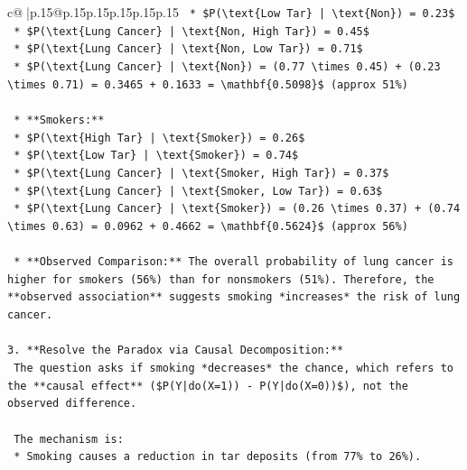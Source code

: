 \documentclass{article}
\begin{document}
{\begin{supertabular}{c@{$\;$}|p{.15\linewidth}@{}p{.15\linewidth}p{.15\linewidth}p{.15\linewidth}p{.15\linewidth}p{.15\linewidth}}
{{{\texttt{        *   \$P(\textbackslash{}text\{Low Tar\} | \textbackslash{}text\{Non\}) = 0.23\$} \\
\texttt{        *   \$P(\textbackslash{}text\{Lung Cancer\} | \textbackslash{}text\{Non, High Tar\}) = 0.45\$} \\
\texttt{        *   \$P(\textbackslash{}text\{Lung Cancer\} | \textbackslash{}text\{Non, Low Tar\}) = 0.71\$} \\
\texttt{        *   \$P(\textbackslash{}text\{Lung Cancer\} | \textbackslash{}text\{Non\}) = (0.77 \textbackslash{}times 0.45) + (0.23 \textbackslash{}times 0.71) = 0.3465 + 0.1633 = \textbackslash{}mathbf\{0.5098\}\$ (approx 51\%)} \\
\\ 
\texttt{    *   **Smokers:**} \\
\texttt{        *   \$P(\textbackslash{}text\{High Tar\} | \textbackslash{}text\{Smoker\}) = 0.26\$} \\
\texttt{        *   \$P(\textbackslash{}text\{Low Tar\} | \textbackslash{}text\{Smoker\}) = 0.74\$} \\
\texttt{        *   \$P(\textbackslash{}text\{Lung Cancer\} | \textbackslash{}text\{Smoker, High Tar\}) = 0.37\$} \\
\texttt{        *   \$P(\textbackslash{}text\{Lung Cancer\} | \textbackslash{}text\{Smoker, Low Tar\}) = 0.63\$} \\
\texttt{        *   \$P(\textbackslash{}text\{Lung Cancer\} | \textbackslash{}text\{Smoker\}) = (0.26 \textbackslash{}times 0.37) + (0.74 \textbackslash{}times 0.63) = 0.0962 + 0.4662 = \textbackslash{}mathbf\{0.5624\}\$ (approx 56\%)} \\
\\ 
\texttt{    *   **Observed Comparison:** The overall probability of lung cancer is higher for smokers (56\%) than for nonsmokers (51\%). Therefore, the **observed association** suggests smoking *increases* the risk of lung cancer.} \\
\\ 
\texttt{3.  **Resolve the Paradox via Causal Decomposition:**} \\
\texttt{    The question asks if smoking *decreases* the chance, which refers to the **causal effect** (\$P(Y|do(X=1)) {-} P(Y|do(X=0))\$), not the observed difference.} \\
\\ 
\texttt{    The mechanism is:} \\
\texttt{    *   Smoking causes a reduction in tar deposits (from 77\% to 26\%).} \\
}}}
\end{supertabular}}
\end{document}
